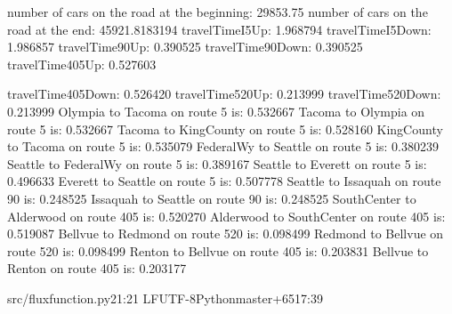 number of cars on the road at the beginning:
29853.75
number of cars on the road at the end:
45921.8183194
travelTimeI5Up: 1.968794
travelTimeI5Down: 1.986857
travelTime90Up: 0.390525
travelTime90Down: 0.390525
travelTime405Up: 0.527603

travelTime405Down: 0.526420
travelTime520Up: 0.213999
travelTime520Down: 0.213999
Olympia to Tacoma on route 5 is: 0.532667
Tacoma to Olympia on route 5 is: 0.532667
Tacoma to KingCounty on route 5 is: 0.528160
KingCounty to Tacoma on route 5 is: 0.535079
FederalWy to Seattle on route 5 is: 0.380239
Seattle to FederalWy on route 5 is: 0.389167
Seattle to Everett on route 5 is: 0.496633
Everett to Seattle on route 5 is: 0.507778
Seattle to Issaquah on route 90 is: 0.248525
Issaquah to Seattle on route 90 is: 0.248525
SouthCenter to Alderwood on route 405 is: 0.520270
Alderwood to SouthCenter on route 405 is: 0.519087
Bellvue to Redmond on route 520 is: 0.098499
Redmond to Bellvue on route 520 is: 0.098499
Renton to Bellvue on route 405 is: 0.203831
Bellvue to Renton on route 405 is: 0.203177

src/fluxfunction.py21:21
LFUTF-8Pythonmaster+6517:39
